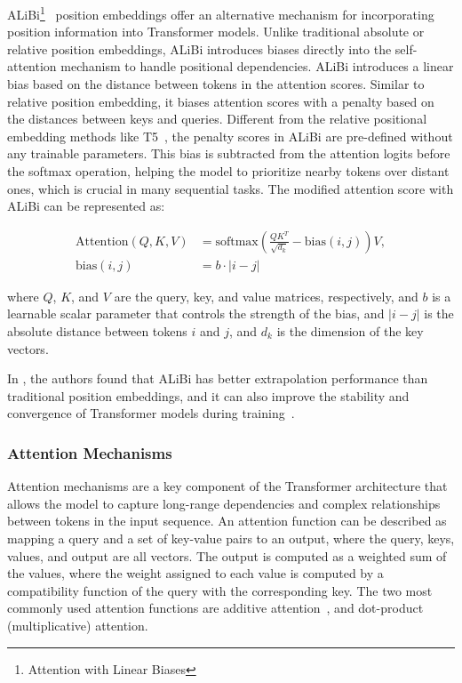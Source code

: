 ALiBi\footnote{Attention with Linear Biases}~\cite{press2022train} position embeddings offer an alternative mechanism for incorporating position information into Transformer models.
Unlike traditional absolute or relative position embeddings, ALiBi introduces biases directly into the self-attention mechanism to handle positional dependencies.
ALiBi introduces a linear bias based on the distance between tokens in the attention scores.
Similar to relative position embedding, it biases attention scores with a penalty based on the distances between keys and queries.
Different from the relative positional embedding methods like T5~\cite{zeng2021pangu}, the penalty scores in ALiBi are pre-defined without any trainable parameters.
This bias is subtracted from the attention logits before the softmax operation, helping the model to prioritize nearby tokens over distant ones, which is crucial in many sequential tasks.
The modified attention score with ALiBi can be represented as:

\begin{equation}
	\begin{aligned}
		\text{Attention}(Q, K, V) & = \text{softmax}\left(\frac{QK^T}{\sqrt{d_k}} - \text{bias}(i,j)\right)V, \\
		\text{bias}(i,j)          & = b \cdotp |i-j|
	\end{aligned}
	\label{eq:alibi}
\end{equation}

\noindent where \(Q\), \(K\), and \(V\) are the query, key, and value matrices, respectively, and \(b\) is a learnable scalar parameter that controls the strength of the bias, and \(|i-j|\) is the absolute distance between tokens \(i\) and \(j\), and \(d_k\) is the dimension of the key vectors.

In \textcite{press2022train}, the authors found that ALiBi has better extrapolation performance than traditional position embeddings, and it can also improve the stability and convergence of Transformer models during training~\cite{workshop2023bloom}.

\subsubsection{Attention Mechanisms}
\label{subsubsec:attention-mechanisms}

Attention mechanisms are a key component of the Transformer architecture that allows the model to capture long-range dependencies and complex relationships between tokens in the input sequence.
An attention function can be described as mapping a query and a set of key-value pairs to an output, where the query, keys, values, and output are all vectors.
The output is computed as a weighted sum of the values, where the weight assigned to each value is computed by a compatibility function of the query with the corresponding key.
The two most commonly used attention functions are additive attention~\cite{bahdanau2014neural}, and dot-product (multiplicative) attention.

